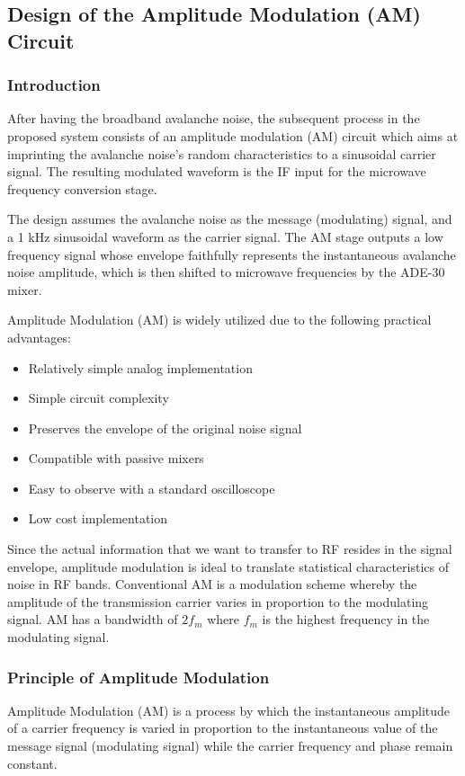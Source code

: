 \documentclass[12pt,a4paper]{report}
\begin{document}
	\subsection{Design of the Amplitude Modulation (AM) Circuit}
	
	\subsubsection{Introduction}
	After having the broadband avalanche noise, the subsequent process in the proposed system consists of an amplitude modulation (AM) circuit which aims at imprinting the avalanche noise's random characteristics to a sinusoidal carrier signal. The resulting modulated waveform is the IF input for the microwave frequency conversion stage.
	
	The design assumes the avalanche noise as the message (modulating) signal, and a 1 kHz sinusoidal waveform as the carrier signal. The AM stage outputs a low frequency signal whose envelope faithfully represents the instantaneous avalanche noise amplitude, which is then shifted to microwave frequencies by the ADE-30 mixer.
	
	Amplitude Modulation (AM) is widely utilized due to the following practical advantages:
	\begin{itemize}
		\item Relatively simple analog implementation
		\item Simple circuit complexity
		\item Preserves the envelope of the original noise signal
		\item Compatible with passive mixers
		\item Easy to observe with a standard oscilloscope
		\item Low cost implementation
	\end{itemize}
	
	Since the actual information that we want to transfer to RF resides in the signal envelope, amplitude modulation is ideal to translate statistical characteristics of noise in RF bands. Conventional AM is a modulation scheme whereby the amplitude of the transmission carrier varies in proportion to the modulating signal. AM has a bandwidth of $2f_m$ where $f_m$ is the highest frequency in the modulating signal.
	\subsubsection{Principle of Amplitude Modulation}
	Amplitude Modulation (AM) is a process by which the instantaneous amplitude of a carrier frequency is varied in proportion to the instantaneous value of the message signal (modulating signal) while the carrier frequency and phase remain constant.
	
\end{document}
